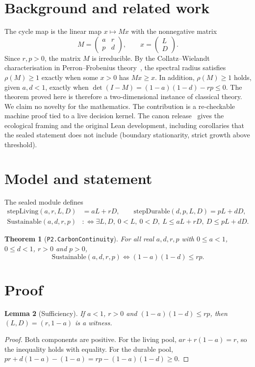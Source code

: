 \documentclass[11pt]{article}
\newtheorem{theorem}{Theorem}
\newtheorem{lemma}[theorem]{Lemma}
\theoremstyle{remark}
\begin{document}
\section{Background and related work}
The cycle map is the linear map $x\mapsto Mx$ with the nonnegative matrix
\[
M=\begin{pmatrix} a & r\\ p & d\end{pmatrix},\qquad x=\begin{pmatrix}L\\ D\end{pmatrix}.
\]
Since $r,p>0$, the matrix $M$ is irreducible.
By the Collatz--Wielandt characterisation in Perron--Frobenius theory~\cite{BermanPlemmons1994},
the spectral radius satisfies $\rho(M)\ge 1$ exactly when some $x>0$ has $Mx\ge x$.
In addition, $\rho(M)\ge 1$ holds, given $a,d<1$, exactly when $\det(I-M)=(1-a)(1-d)-rp\le 0$.
The theorem proved here is therefore a two-dimensional instance of classical theory.
We claim no novelty for the mathematics. The contribution is a re-checkable machine proof
tied to a live decision kernel.
The canon release~\cite{HartCanon2026} gives the ecological framing and the original Lean development,
including corollaries that the sealed statement does not include (boundary stationarity, strict growth above threshold).

\section{Model and statement}
The sealed module defines
\begin{align*}
\mathrm{stepLiving}(a,r,L,D) &= aL+rD, \qquad \mathrm{stepDurable}(d,p,L,D) = pL+dD,\\
\mathrm{Sustainable}(a,d,r,p) &:\iff \exists L,D,\ 0<L,\ 0<D,\ L\le aL+rD,\ D\le pL+dD.
\end{align*}

\begin{theorem}[\texttt{P2.CarbonContinuity}]
For all real $a,d,r,p$ with $0\le a<1$, $0\le d<1$, $r>0$ and $p>0$,
\[
\mathrm{Sustainable}(a,d,r,p)\iff (1-a)(1-d)\le rp .
\]
\end{theorem}

\section{Proof}
\begin{lemma}[Sufficiency]
If $a<1$, $r>0$ and $(1-a)(1-d)\le rp$, then $(L,D)=(r,1-a)$ is a witness.
\end{lemma}
\begin{proof}
Both components are positive. For the living pool, $ar+r(1-a)=r$, so the inequality holds with equality.
For the durable pool, $pr+d(1-a)-(1-a)=rp-(1-a)(1-d)\ge 0$.
\end{proof}
\end{document}

